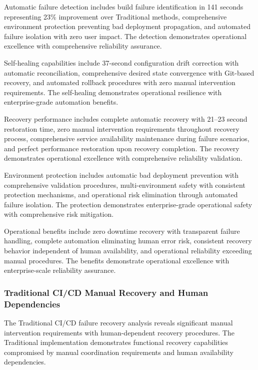 Automatic failure detection includes build failure identification in 141 seconds representing 23\% improvement over Traditional methods, comprehensive environment protection preventing bad deployment propagation, and automated failure isolation with zero user impact. The detection demonstrates operational excellence with comprehensive reliability assurance.

Self-healing capabilities include 37-second configuration drift correction with automatic reconciliation, comprehensive desired state convergence with Git-based recovery, and automated rollback procedures with zero manual intervention requirements. The self-healing demonstrates operational resilience with enterprise-grade automation benefits.

Recovery performance includes complete automatic recovery with 21--23 second restoration time, zero manual intervention requirements throughout recovery process, comprehensive service availability maintenance during failure scenarios, and perfect performance restoration upon recovery completion. The recovery demonstrates operational excellence with comprehensive reliability validation.

Environment protection includes automatic bad deployment prevention with comprehensive validation procedures, multi-environment safety with consistent protection mechanisms, and operational risk elimination through automated failure isolation. The protection demonstrates enterprise-grade operational safety with comprehensive risk mitigation.

Operational benefits include zero downtime recovery with transparent failure handling, complete automation eliminating human error risk, consistent recovery behavior independent of human availability, and operational reliability exceeding manual procedures. The benefits demonstrate operational excellence with enterprise-scale reliability assurance.

\subsubsection{Traditional CI/CD Manual Recovery and Human Dependencies}

The Traditional CI/CD failure recovery analysis reveals significant manual intervention requirements with human-dependent recovery procedures. The Traditional implementation demonstrates functional recovery capabilities compromised by manual coordination requirements and human availability dependencies.

